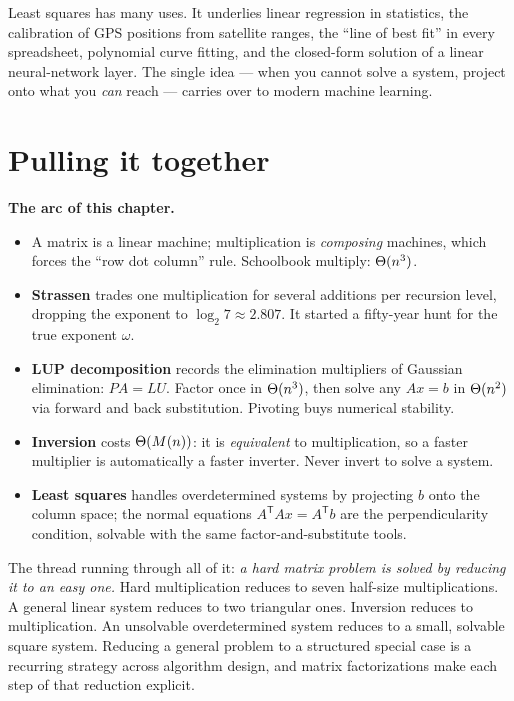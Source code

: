 \begin{aestheticbox}
Least squares has many uses. It underlies linear regression in
statistics, the calibration of GPS positions from satellite ranges, the
``line of best fit'' in every spreadsheet, polynomial curve fitting, and the
closed-form solution of a linear neural-network layer. The single idea --- when
you cannot solve a system, project onto what you \emph{can} reach --- carries over
to modern machine learning.
\end{aestheticbox}

\section{Pulling it together}

\begin{focusbox}
\textbf{The arc of this chapter.}
\begin{itemize}
\item A matrix is a linear machine; multiplication is \emph{composing} machines,
which forces the ``row dot column'' rule. Schoolbook multiply: $\Theta(n^3)$.
\item \textbf{Strassen} trades one multiplication for several additions per
recursion level, dropping the exponent to $\log_2 7\approx 2.807$. It started a
fifty-year hunt for the true exponent $\omega$.
\item \textbf{LUP decomposition} records the elimination multipliers of Gaussian elimination:
$PA=LU$. Factor once in $\Theta(n^3)$, then solve any $Ax=b$ in $\Theta(n^2)$ via
forward and back substitution. Pivoting buys numerical stability.
\item \textbf{Inversion} costs $\Theta(M(n))$: it is \emph{equivalent} to
multiplication, so a faster multiplier is automatically a faster inverter. Never
invert to solve a system.
\item \textbf{Least squares} handles overdetermined systems by projecting $b$ onto
the column space; the normal equations $A^{\mathsf T}Ax=A^{\mathsf T}b$ are the
perpendicularity condition, solvable with the same factor-and-substitute tools.
\end{itemize}
\end{focusbox}

The thread running through all of it: \emph{a hard matrix problem is solved by
reducing it to an easy one.} Hard multiplication reduces to seven half-size
multiplications. A general linear system reduces to two triangular ones. Inversion
reduces to multiplication. An unsolvable overdetermined system reduces to a small,
solvable square system. Reducing a general problem to a structured special case
is a recurring strategy across algorithm design, and matrix factorizations make
each step of that reduction explicit.

